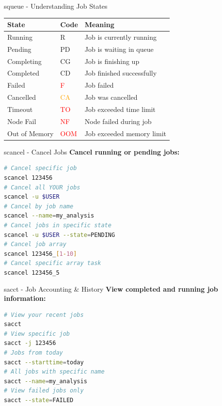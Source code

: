 \documentclass[aspectratio=169]{beamer}
\begin{document}
\begin{frame}[fragile]{squeue - Understanding Job States}
\begin{table}
\small
\begin{tabular}{lll}
\toprule
\textbf{State} & \textbf{Code} & \textbf{Meaning} \\
\midrule
Running & \textcolor{accentgreen}{R} & Job is currently running \\
Pending & \textcolor{ceciblue}{PD} & Job is waiting in queue \\
Completing & \textcolor{ceciblue}{CG} & Job is finishing up \\
Completed & \textcolor{accentgreen}{CD} & Job finished successfully \\
Failed & \textcolor{red}{F} & Job failed \\
Cancelled & \textcolor{orange}{CA} & Job was cancelled \\
Timeout & \textcolor{red}{TO} & Job exceeded time limit \\
Node Fail & \textcolor{red}{NF} & Node failed during job \\
Out of Memory & \textcolor{red}{OOM} & Job exceeded memory limit \\
\bottomrule
\end{tabular}
\end{table}


\end{frame}

\begin{frame}[fragile]{scancel - Cancel Jobs}
\textbf{Cancel running or pending jobs:}

\begin{lstlisting}[language=bash]
# Cancel specific job
scancel 123456
# Cancel all YOUR jobs
scancel -u $USER
# Cancel by job name
scancel --name=my_analysis
# Cancel jobs in specific state
scancel -u $USER --state=PENDING
# Cancel job array
scancel 123456_[1-10]
# Cancel specific array task
scancel 123456_5
\end{lstlisting}

\end{frame}

\begin{frame}[fragile]{sacct - Job Accounting \& History}
\textbf{View completed and running job information:}

\begin{lstlisting}[language=bash]
# View your recent jobs
sacct
# View specific job
sacct -j 123456
# Jobs from today
sacct --starttime=today
# All jobs with specific name
sacct --name=my_analysis
# View failed jobs only
sacct --state=FAILED
\end{lstlisting}
\end{frame}
\end{document}
